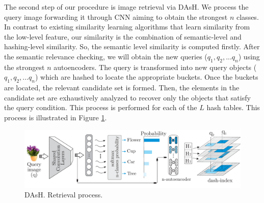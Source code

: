 \documentclass[conference]{IEEEtran}
\begin{document}


The second step of our procedure is image retrieval via  DAsH. We process the query image  forwarding it through CNN aiming to obtain the strongest $n$ classes. In contrast to existing similarity learning algorithms that learn similarity from the low-level feature, our similarity is the combination of semantic-level and hashing-level similarity. So, the semantic level similarity is computed firstly. After the semantic relevance checking, we will obtain the new queries ($q_1, q_2, ... q_n$) using the strongest  $n$ autoencoders. The query is transformed into new query objects ($q_1, q_2, ... q_n$) which are hashed to locate the appropriate buckets. Once the buckets are located, the relevant candidate set is formed.  Then, the elements in the candidate set are exhaustively analyzed to recover only the objects that satisfy the query condition. This process is performed for each of the $L$ hash tables. This process is illustrated in Figure \ref{fig:qdash}.  
\begin{figure}[htp]\centering
\label{fig:qdash}
 \includegraphics[width=1.70\columnwidth]{dash/DAsh_retrieval_final.pdf} 
\caption{ DAsH. Retrieval process. } 
\end{figure}



\end{document}
